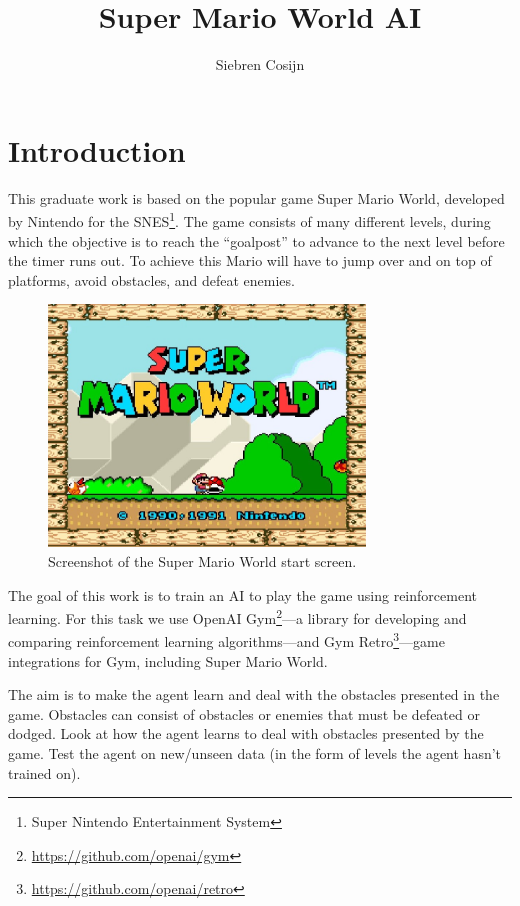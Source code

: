 \documentclass[a4paper]{article}
\title{Super Mario World AI}
\author{Siebren Cosijn}
\date{\displaydate{date}}
\begin{document}
\maketitle

\section{Introduction} \label{s:introduction}
This graduate work is based on the popular game Super Mario World, developed by Nintendo for the SNES\footnote{Super Nintendo Entertainment System}.
The game consists of many different levels, during which the objective is to reach the ``goalpost'' to advance to the next level before the timer runs out.
To achieve this Mario will have to jump over and on top of platforms, avoid obstacles, and defeat enemies.

\begin{figure}[htbp]
    \centering
    \includegraphics[width=0.75\textwidth]{start-screen}
    \caption{Screenshot of the Super Mario World start screen.}
    \label{fig:smw}
\end{figure}

The goal of this work is to train an AI to play the game using reinforcement learning.
For this task we use OpenAI Gym\footnote{\url{https://github.com/openai/gym}}---a library for developing and comparing reinforcement learning algorithms---and Gym Retro\footnote{\url{https://github.com/openai/retro}}---game integrations for Gym, including Super Mario World.

The aim is to make the agent learn and deal with the obstacles presented in the game.
Obstacles can consist of obstacles or enemies that must be defeated or dodged.
Look at how the agent learns to deal with obstacles presented by the game.
Test the agent on new/unseen data (in the form of levels the agent hasn't trained on).
\end{document}
